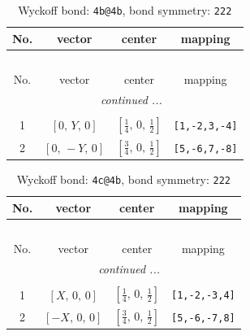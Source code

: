 \documentclass[fleqn,8pt]{jsarticle}
\begin{document}
\renewcommand{\arraystretch}{1.2}
\begin{longtable}{cccc}
\caption{Wyckoff bond: {\tt 4b@4b}, bond symmetry: {\tt 222}}
 \\
 \hline \hline
No. & vector & center & mapping \\ \hline \endfirsthead

\multicolumn{3}{l}{\tablename\ \thetable{}} \\
 \hline \hline
No. & vector & center & mapping \\ \hline \endhead

 \hline \hline
\multicolumn{3}{r}{\footnotesize\it continued ...} \\ \endfoot

 \hline \hline
\multicolumn{3}{r}{} \\ \endlastfoot

1 & $\left[ 0,\, Y,\, 0 \right]$ & $\left[ \frac{1}{4},\, 0,\, \frac{1}{2} \right]$ & {\tt [1,-2,3,-4]} \\ \hline
2 & $\left[ 0,\, - Y,\, 0 \right]$ & $\left[ \frac{3}{4},\, 0,\, \frac{1}{2} \right]$ & {\tt [5,-6,7,-8]} \\
\end{longtable}
\renewcommand{\arraystretch}{1.2}
\begin{longtable}{cccc}
\caption{Wyckoff bond: {\tt 4c@4b}, bond symmetry: {\tt 222}}
 \\
 \hline \hline
No. & vector & center & mapping \\ \hline \endfirsthead

\multicolumn{3}{l}{\tablename\ \thetable{}} \\
 \hline \hline
No. & vector & center & mapping \\ \hline \endhead

 \hline \hline
\multicolumn{3}{r}{\footnotesize\it continued ...} \\ \endfoot

 \hline \hline
\multicolumn{3}{r}{} \\ \endlastfoot

1 & $\left[ X,\, 0,\, 0 \right]$ & $\left[ \frac{1}{4},\, 0,\, \frac{1}{2} \right]$ & {\tt [1,-2,-3,4]} \\ \hline
2 & $\left[ - X,\, 0,\, 0 \right]$ & $\left[ \frac{3}{4},\, 0,\, \frac{1}{2} \right]$ & {\tt [5,-6,-7,8]} \\
\end{longtable}
\renewcommand{\arraystretch}{1.2}
\end{document}
